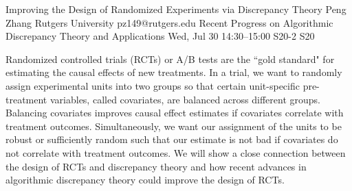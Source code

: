 \documentclass[12pt,lettersize,oneside]{book} %
\begin{document}
\begin{talk}
  {Improving the Design of Randomized Experiments via Discrepancy Theory}%
  {Peng Zhang}%
  {Rutgers University}%
  {pz149@rutgers.edu}%
  {Recent Progress on Algorithmic Discrepancy Theory and Applications}%
  {}%
  {Wed, Jul 30 14:30--15:00}%
  {S20-2}%
  {S20}%
    
   
Randomized controlled trials (RCTs) or A/B tests are the ``gold standard" for estimating the causal effects of new treatments. In a trial, we want to randomly assign experimental units into two groups so that certain unit-specific pre-treatment variables, called covariates, are balanced across different groups. Balancing covariates improves causal effect estimates if covariates correlate with treatment outcomes. Simultaneously, we want our assignment of the units to be robust or sufficiently random such that our estimate is not bad if covariates do not correlate with treatment outcomes. We will show a close connection between the design of RCTs and discrepancy theory and how recent advances in algorithmic discrepancy theory could improve the design of RCTs.

\medskip


\end{talk}
\end{document}
